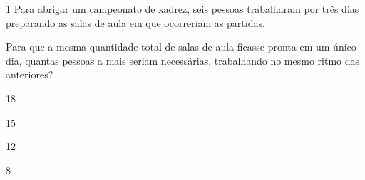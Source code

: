 \begin{escolha}
\begin{boxmedio}
\begin{boxmedio}
{\begin{boxpeq}
\begin{boxpeq}
{\begin{boxpeq}
\begin{boxmedio}
\begin{boxmedio}
\begin{boxpeq}
\begin{boxmedio}
\begin{boxpeq}
\begin{boxpeq}
\begin{boxpeq}
\begin{boxpeq}
\begin{boxmedio}
{\begin{boxmedio}
\begin{boxmedio}
\begin{boxpeq}
\begin{boxmedio}
\begin{boxpeq}
\begin{boxpeq}
\begin{boxpeq}
\begin{escolha}
{\begin{boxmedio}
\begin{boxpeq}
\begin{boxpeq}
\begin{boxpeq}
\begin{boxpeq}
\begin{boxpeq}
\begin{boxmedio}
\begin{boxpeq}
\begin{boxpeq}
\begin{boxpeq}
{\begin{boxpeq}
\begin{boxmedio}
\begin{boxpeq}
\begin{boxpeq}
\begin{boxpeq}
{\begin{boxpeq}
\begin{boxmedio}
\num{1} Para abrigar um campeonato de xadrez, seis pessoas trabalharam por 
três dias preparando as salas de aula em que ocorreriam as partidas.

Para que a mesma quantidade total de salas de aula ficasse pronta em um
único dia, quantas pessoas a mais seriam necessárias, trabalhando no mesmo 
ritmo das anteriores?

\begin{escolha}

  \item 18

  \item 15

  \item 12

  \item 8

\end{escolha}

\end{boxmedio}
\end{boxpeq}}
\end{boxpeq}
\end{boxpeq}
\end{boxpeq}
\end{boxmedio}
\end{boxpeq}}
\end{boxpeq}
\end{boxpeq}
\end{boxpeq}
\end{boxmedio}
\end{boxpeq}
\end{boxpeq}
\end{boxpeq}
\end{boxpeq}
\end{boxpeq}
\end{boxmedio}}
\end{escolha}
\end{boxpeq}
\end{boxpeq}
\end{boxpeq}
\end{boxmedio}
\end{boxpeq}
\end{boxmedio}
\end{boxmedio}}
\end{boxmedio}
\end{boxpeq}
\end{boxpeq}
\end{boxpeq}
\end{boxpeq}
\end{boxmedio}
\end{boxpeq}
\end{boxmedio}
\end{boxmedio}
\end{boxpeq}}
\end{boxpeq}
\end{boxpeq}}
\end{boxmedio}
\end{boxmedio}
\end{escolha}
